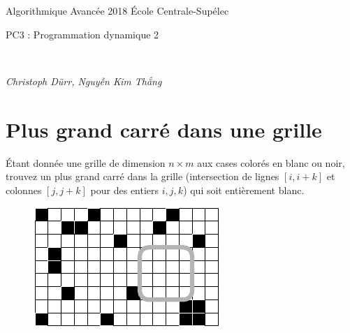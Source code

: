 \documentclass[12pt]{article}
\newcommand{\MakeScribeTop}[1]{
\noindent
\begin{framed}
\noindent
 Algorithmique Avancée 2018
 \hfill
 École Centrale-Supélec
 \\[1em]
 \centerline{ \Large
#1
 }
 \\[1em]
\centerline{  \it Christoph Dürr, Nguyễn Kim Thắng}
\end{framed}
}
\begin{document}
    \MakeScribeTop{PC3 : Programmation dynamique 2}




\section{Plus grand carré dans une grille}

Étant donnée une grille de dimension $n\times m$ aux cases colorés en blanc ou noir, trouvez un plus grand carré dans la grille (intersection de lignes $[i,i+k]$ et colonnes $[j,j+k]$ pour des entiers $i,j,k$) qui soit entièrement blanc.

\begin{figure}[h]
\centerline{\includegraphics{plus_grand_carre}}
\end{figure}
\end{document}

